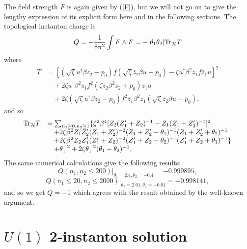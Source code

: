 \documentclass[a4paper,a4paper]{article}
\begin{document}
The field strength $F$ is again given by (\ref{F}), but we will
not go on to give the lengthy expression of its explicit form here
and in the following sections. The topological instanton charge is
\begin{equation}
Q=-\frac{1}{8\pi^2}\int F\wedge F=-|\theta_1\theta_2| {\rm
Tr}_{\cal H}T
\end{equation}
where
\begin{equation}
\begin{array}{rl}
T&=[(\sqrt{\zeta}u^\dag\beta z_2-p_0)f(\sqrt{\zeta}\bar
z_2\beta u-p_0)-\zeta u^\dag\beta^2 z_1 f\bar z_1 u]^2\\
&\quad+2\zeta u^\dag\beta^2 z_1 f^2(\zeta\bar z_2\beta^2
z_2+p_0)\bar z_1 u\\
&\quad+2\zeta(\sqrt{\zeta}u^\dag\beta z_2-p_0)f^2\bar z_1
\beta^2 z_1(\sqrt{\zeta}\bar z_2\beta u-p_0),
\end{array}
\end{equation}
and so
\begin{equation}
\begin{array}{rl}
{\rm Tr}_{\cal H}T&=\sum_{n_1\geq 0,n_2\geq 1}\{\zeta^2
\beta^4[Z_2(Z_1'+Z_2)^{-1}-Z_1(Z_1+Z_2')^{-1}]^2\\
&\quad+2\zeta\beta^2 Z_1 Z_2'(Z_1+Z_2')^{-2}(Z_1+Z_2'-
\theta_1)^{-1}(Z_1+Z_2'+\theta_2)^{-1}\\
&\quad+2\zeta\beta^2 Z_2 Z_1'(Z_1'+Z_2)^{-2}(Z_1'+Z_2-
\theta_2)^{-1}(Z_1'+Z_2+\theta_1)^{-1}\}\\
&\quad+\theta_1^{-2}+2\zeta\theta_1^{-2}(\theta_1- \theta_2)^{-1},
\end{array}
\end{equation}
The same numerical calculations give the following results:
\begin{equation}
Q(n_1,n_2\leq 200)|_{\theta_1=2.4,\theta_2=-0.4}=-0.999895,
\end{equation}
\begin{equation}
Q(n_1\leq 20,n_2\leq 2000)|_{\theta_1=2.01,\theta_2=-0.01}
=-0.998141,
\end{equation}
and so we get $Q=-1$ which agrees with the result obtained by the
well-known argument.

\section{$U(1)$ 2-instanton solution}
\end{document}
